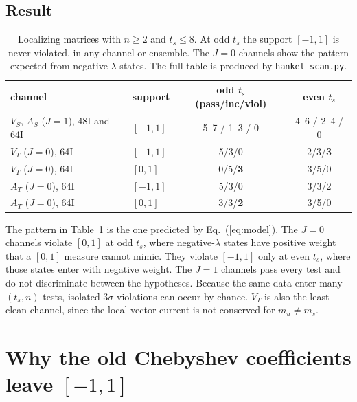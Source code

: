 \documentclass[11pt]{article}
\theoremstyle{remark}
\begin{document}
\subsection{Result}
\begin{table}[h]
\centering\small
\begin{tabular}{llcc}
\toprule
channel & support & odd $t_s$ (pass/inc/viol) & even $t_s$ \\
\midrule
$V_S$, $A_S$ ($J=1$), 48I and 64I & $[-1,1]$ & 5--7 / 1--3 / 0 & 4--6 / 2--4 / 0 \\
$V_T$ ($J=0$), 64I & $[-1,1]$ & 5/3/0 & 2/3/\textbf{3} \\
$V_T$ ($J=0$), 64I & $[0,1]$ & 0/5/\textbf{3} & 3/5/0 \\
$A_T$ ($J=0$), 64I & $[-1,1]$ & 5/3/0 & 3/3/2 \\
$A_T$ ($J=0$), 64I & $[0,1]$ & 3/3/\textbf{2} & 3/5/0 \\
\bottomrule
\end{tabular}
\caption{Localizing matrices with $n\ge2$ and $t_s\le8$. At odd $t_s$ the support $[-1,1]$ is never violated, in any channel or ensemble.
The $J=0$ channels show the pattern expected from negative-$\lambda$ states. The full table is produced by \texttt{hankel\_scan.py}.}
\label{tab:hankel}
\end{table}
The pattern in Table~\ref{tab:hankel} is the one predicted by Eq.~(\ref{eq:model}). The $J=0$ channels violate $[0,1]$ at odd $t_s$, where negative-$\lambda$ states have positive weight that a $[0,1]$ measure cannot mimic.
They violate $[-1,1]$ only at even $t_s$, where those states enter with negative weight.
The $J=1$ channels pass every test and do not discriminate between the hypotheses. Because the same data enter many $(t_s,n)$ tests, isolated $3\sigma$ violations can occur by chance.
$V_T$ is also the least clean channel, since the local vector current is not conserved for $m_u\ne m_s$.

\section{Why the old Chebyshev coefficients leave $[-1,1]$}\label{sec:cheb}
\end{document}
